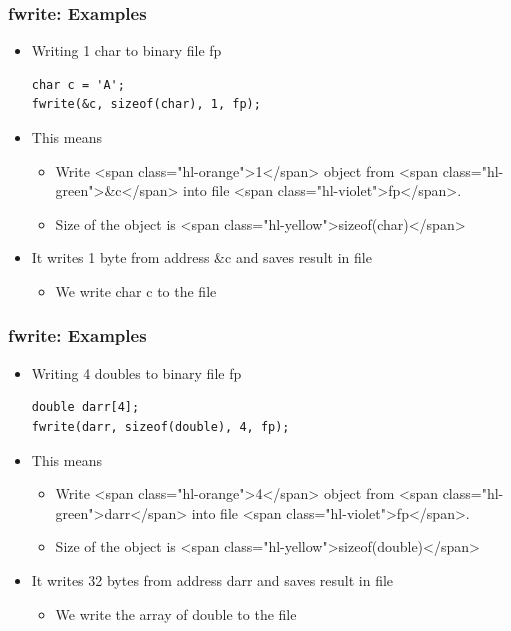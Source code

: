 \documentclass{../c-lecture}
\begin{document}
\begin{frame}
  \frametitle{fwrite: Examples}
  \begin{itemize}
    \item Writing 1 char to binary file fp
    \begin{verbatim}
char c = 'A';
fwrite(&c, sizeof(char), 1, fp);
    \end{verbatim}
    \item This means
    \begin{itemize}
      \item
        Write <span class="hl-orange">1</span> object from
        <span class="hl-green">&c</span> into file
        <span class="hl-violet">fp</span>.

      \item Size of the object is <span class="hl-yellow">sizeof(char)</span>
    \end{itemize}
    \item It writes 1 byte from address &c and saves result in file
    \begin{itemize}
      \item We write char c to the file
    \end{itemize}
  \end{itemize}
\end{frame}

\begin{frame}
  \frametitle{fwrite: Examples}
  \begin{itemize}
    \item Writing 4 doubles to binary file fp
    \begin{verbatim}
double darr[4];
fwrite(darr, sizeof(double), 4, fp);
    \end{verbatim}
    \item This means
    \begin{itemize}
      \item
        Write <span class="hl-orange">4</span> object from
        <span class="hl-green">darr</span> into file
        <span class="hl-violet">fp</span>.

      \item
        Size of the object is <span class="hl-yellow">sizeof(double)</span>

    \end{itemize}
    \item It writes 32 bytes from address darr and saves result in file
    \begin{itemize}
      \item We write the array of double to the file
    \end{itemize}
  \end{itemize}
\end{frame}
\end{document}
